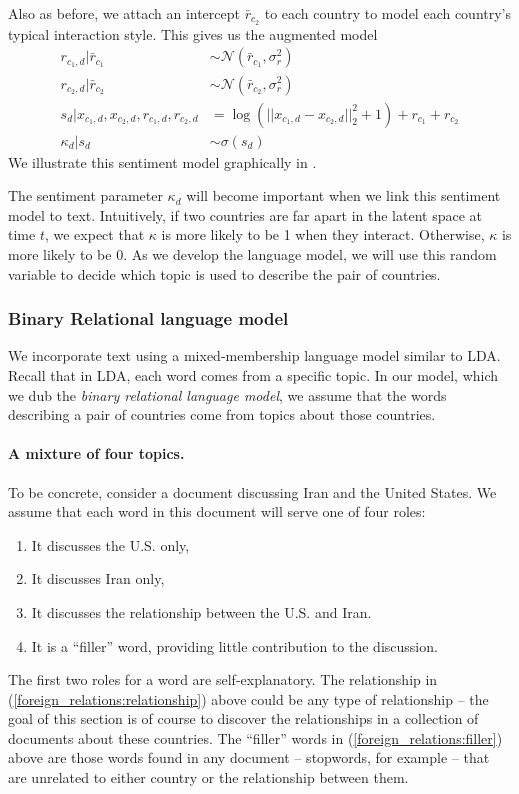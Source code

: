 Also as before, we attach an intercept $\bar r_{c_2}$ to each country
to model each country's typical interaction style.  This gives us the augmented model
\begin{align}
  r_{c_1,d} | \bar r_{c_1} & \sim \mathcal{N}(\bar r_{c_1}, \sigma_r^2) \nonumber \\
  r_{c_2,d} | \bar r_{c_2} & \sim \mathcal{N}(\bar r_{c_2}, \sigma_r^2) \nonumber \\
  s_d | x_{c_1,d}, x_{c_2,d}, r_{c_1,d}, r_{c_2,d} & = \log( || x_{c_1,d} - x_{c_2,d} ||_2^2 + 1)  + r_{c_1} + r_{c_2} \nonumber \\
  \kappa_d | s_d & \sim \sigma(s_d)
\end{align}
We illustrate this sentiment model graphically in .

The sentiment parameter $\kappa_d$ will become important when we link
this sentiment model to text.  Intuitively, if two countries are far
apart in the latent space at time $t$, we expect that $\kappa$ is more
likely to be 1 when they interact.  Otherwise, $\kappa$ is more likely
to be 0.  As we develop the language model, we will use this random
variable to decide which topic is used to describe the pair of countries.

\subsubsection*{Binary Relational language model}
We incorporate text using a mixed-membership language model similar to
LDA.  Recall that in LDA, each word comes from a specific topic.  In
our model, which we dub the \emph{binary relational language model},
we assume that the words describing a pair of countries come from
topics about those countries.

\paragraph{A mixture of four topics.} To be concrete, consider a document discussing Iran and the United
States.  We assume that each word in this document will serve one of
four roles:
\begin{enumerate}
  \item It discusses the U.S. only,
  \item It discusses Iran only,
  \item It discusses the relationship between the U.S. and Iran. \label{foreign_relations:relationship}
  \item It is a ``filler'' word, providing little contribution to the discussion. \label{foreign_relations:filler}
\end{enumerate}
The first two roles for a word are self-explanatory.  The relationship in
(\ref{foreign_relations:relationship}) above could be any type of
relationship -- the goal of this section is of course to discover the
relationships in a collection of documents about these
countries.  The ``filler'' words in
(\ref{foreign_relations:filler}) above are those words found in any document
-- stopwords, for example -- that are unrelated to either country or
the relationship between them.

